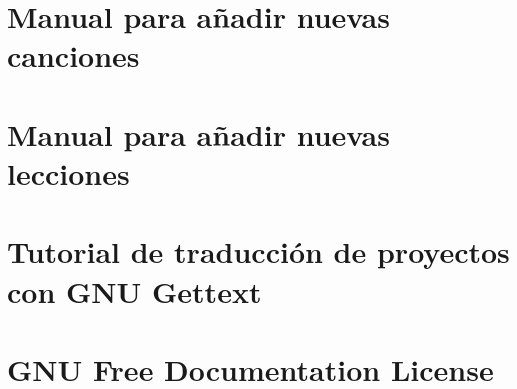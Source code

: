 \documentclass[a4paper,12pt]{scrbook}
\begin{document}
\chapter{Manual para añadir nuevas canciones}
\label{chap:manual_canciones}


\chapter{Manual para añadir nuevas lecciones}
\label{chap:manual_lecciones}


\chapter{Tutorial de traducción de proyectos con GNU Gettext}
\label{chap:tutorial_gettext}


\chapter{GNU Free Documentation License}
\label{sec:fdl}





\printindex
\end{document}
